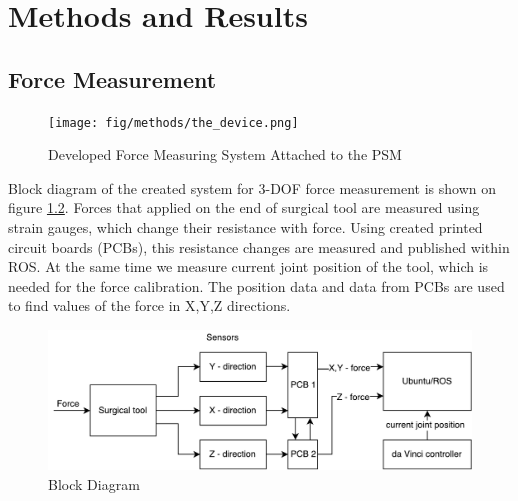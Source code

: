 \chapter{Methods and Results}
\label{methods} %

\section{Force Measurement}
\label{sec:sysArch}

\begin{figure}[h]
	\begin{center}
		\texttt{[image: fig/methods/the\_device.png]}
	\end{center}
	\vspace{-4mm}
	\caption[Developed Force Measuring System Attached to the PSM]
	{Developed Force Measuring System Attached to the PSM}
	\label{fig:PSM_with_FF}
	\vspace{-2mm}
\end{figure}

Block diagram of the created system for 3-DOF force measurement is shown on figure \ref{fig:BlockDiag}. Forces that applied on the end of surgical tool are measured using strain gauges, which change their resistance with force. Using created printed circuit boards (PCBs), this resistance changes are measured and published within ROS. At the same time we measure current joint position of the tool, which is needed for the force calibration. The position data and data from PCBs are used to find values of the force in X,Y,Z directions.

\begin{figure}[h]
	\begin{center}
		\includegraphics[width=140mm]{fig/methods/dbd2.pdf}
	\end{center}
	\vspace{-4mm}
	\caption[Block Diagram]
	{Block Diagram}
	\label{fig:BlockDiag}
	\vspace{-2mm}
\end{figure}


